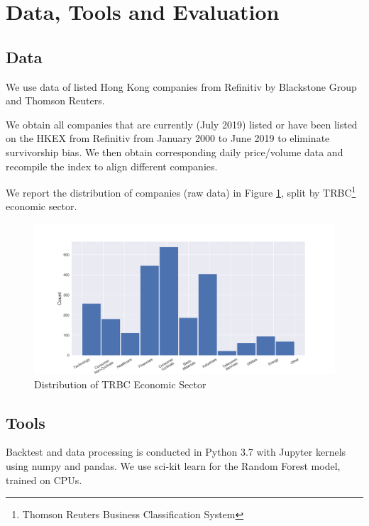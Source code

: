 \documentclass[12pt]{article}
\begin{document}
\section{Data, Tools and Evaluation}

\subsection{Data}

We use data of listed Hong Kong companies from Refinitiv by Blackstone Group and Thomson Reuters.

We obtain all companies that are currently (July 2019) listed or have been listed on the HKEX from Refinitiv from January 2000 to June 2019 to eliminate survivorship bias. We then obtain corresponding daily price/volume data and recompile the index to align different companies.

We report the distribution of companies (raw data) in Figure \ref{fig:sector_dist}, split by TRBC\footnote {Thomson Reuters Business Classification System} economic sector.

\begin{figure}[h]
  \begin{center}
    \includegraphics[width=1\linewidth]{figure/sector_dist.png}
  \end{center}
  \caption{Distribution of TRBC Economic Sector}
  \label{fig:sector_dist}
\end{figure}

\subsection{Tools}

Backtest and data processing is conducted in Python 3.7 with Jupyter kernels using numpy and pandas. We use sci-kit learn for the Random Forest model, trained on CPUs.
\end{document}

